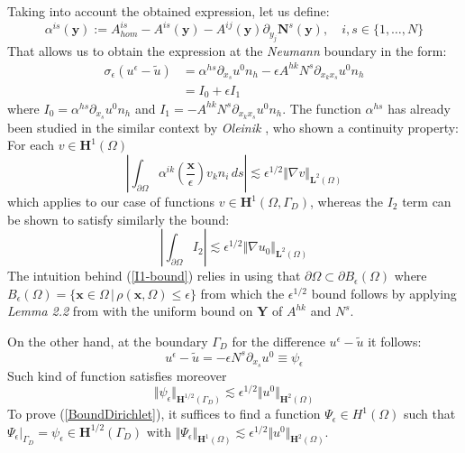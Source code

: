 Taking into account the obtained expression, let us define:
\begin{equation*}
    \alpha^{is}(\mathbf{y}) := A^{is}_{hom} - A^{is}(\mathbf{y}) - A^{ij}(\mathbf{y}) \partial_{y_j} \mathbf{N}^s(\mathbf{y}), \quad i,s \in \{1,\dots, N\}
\end{equation*}
That allows us to obtain the expression at the \textit{Neumann} boundary in the form:
\begin{equation}
    \label{NeumannExp}
    \begin{aligned}
    \sigma_{\epsilon} (u^{\epsilon}-\tilde{u}) &= \alpha^{hs} \partial_{x_s} u^0 n_h - \epsilon A^{hk}N^s \partial_{x_k x_s} u^0 n_h \\
    & = I_0 + \epsilon I_1
    \end{aligned}
\end{equation}
where $I_0 = \alpha^{hs} \partial_{x_s} u^0 n_h$ and $I_1= -A^{hk}N^s \partial_{x_k x_s} u^0 n_h$. 
The function $\alpha^{hs}$ has already been studied in the similar context by \textit{Oleinik} \cite{oleinik1992mathematical}, who shown a continuity property: For each $v \in \mathbf{H}^1(\Omega)$ 
\begin{equation}
    \label{OleinikLemma2.2}
    \left \vert \int_{\partial \Omega} \alpha^{ik}(\frac{\mathbf{x}}{\epsilon}) v_k n_i \,ds \right \vert \lesssim\epsilon^{1/2} \Vert \nabla v \Vert_{\mathbf{L}^2(\Omega)}
\end{equation}
which applies to our case of functions $v \in \mathbf{H}^1(\Omega, \Gamma_D)$, whereas the $I_2$ term can be shown to satisfy similarly the bound:
\begin{equation}
    \label{I1-bound}
    \left \vert \int_{\partial \Omega} I_2 \right \vert \lesssim \epsilon^{1/2} \Vert \nabla u_0 \Vert_{\mathbf{L}^2(\Omega)}
\end{equation}
The intuition behind  (\ref{I1-bound}) relies in using that $\partial \Omega \subset \partial B_{\epsilon}(\Omega)$ where $B_{\epsilon}(\Omega) = \{ \mathbf{x} \in \Omega \, \vert \, \rho(\mathbf{x}, \Omega) \leq \epsilon \}$ from which the $\epsilon^{1/2}$ bound follows by applying \textit{Lemma 2.2} from \cite{oleinik1992mathematical} with the uniform bound on $\mathbf{Y}$ of $A^{hk}$ and $N^s$.


On the other hand, at the boundary $\Gamma_D$ for the difference $u^{\epsilon} - \tilde{u}$ it follows:
\begin{equation*}
    u^{\epsilon} - \tilde{u} = - \epsilon N^s \partial_{x_s}u^0 \equiv \psi_{\epsilon}
\end{equation*} 
Such kind of function satisfies moreover
\begin{equation}
    \label{BoundDirichlet}
    \Vert \psi_{\epsilon} \Vert_{\mathbf{H}^{1/2}(\Gamma_D)} \lesssim \epsilon^{1/2} \Vert u^0 \Vert_{\mathbf{H}^2(\Omega)}
\end{equation} 
To prove (\ref{BoundDirichlet}), it suffices to find a function $\Psi_{\epsilon} \in H^1(\Omega)$ such that $\Psi_{\epsilon} \vert_{\Gamma_D} = \psi_{\epsilon} \in \mathbf{H}^{1/2}(\Gamma_D)$ with $\Vert \Psi_{\epsilon} \Vert_{\mathbf{H}^1(\Omega)} \lesssim \epsilon^{1/2} \Vert u^0 \Vert_{\mathbf{H}^2(\Omega)}$.

